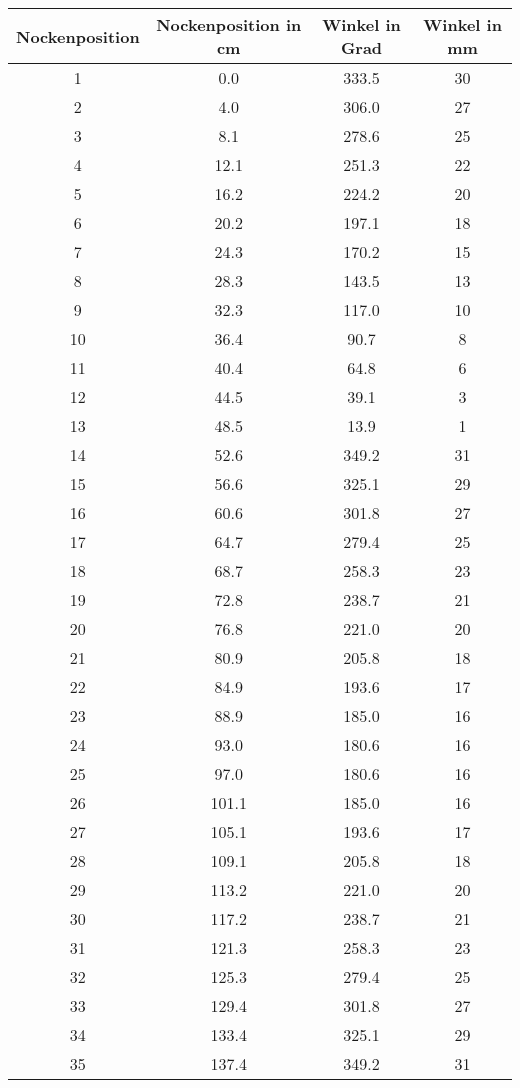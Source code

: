 \documentclass[10pt, a4paper]{article}
\begin{document}
\begin{center}
	\begin{tabular}{c|c|c|c}
		Nockenposition & Nockenposition in cm & Winkel in Grad & Winkel in mm \\
		\hline
		1 & 0.0 & 333.5 & 30 \\
		2 & 4.0 & 306.0 & 27 \\
		3 & 8.1 & 278.6 & 25 \\
		4 & 12.1 & 251.3 & 22 \\
		5 & 16.2 & 224.2 & 20 \\
		6 & 20.2 & 197.1 & 18 \\
		7 & 24.3 & 170.2 & 15 \\
		8 & 28.3 & 143.5 & 13 \\
		9 & 32.3 & 117.0 & 10 \\
		10 & 36.4 & 90.7 & 8 \\
		11 & 40.4 & 64.8 & 6 \\
		12 & 44.5 & 39.1 & 3 \\
		13 & 48.5 & 13.9 & 1 \\
		14 & 52.6 & 349.2 & 31 \\
		15 & 56.6 & 325.1 & 29 \\
		16 & 60.6 & 301.8 & 27 \\
		17 & 64.7 & 279.4 & 25 \\
		18 & 68.7 & 258.3 & 23 \\
		19 & 72.8 & 238.7 & 21 \\
		20 & 76.8 & 221.0 & 20 \\
		21 & 80.9 & 205.8 & 18 \\
		22 & 84.9 & 193.6 & 17 \\
		23 & 88.9 & 185.0 & 16 \\
		24 & 93.0 & 180.6 & 16 \\
		25 & 97.0 & 180.6 & 16 \\
		26 & 101.1 & 185.0 & 16 \\
		27 & 105.1 & 193.6 & 17 \\
		28 & 109.1 & 205.8 & 18 \\
		29 & 113.2 & 221.0 & 20 \\
		30 & 117.2 & 238.7 & 21 \\
		31 & 121.3 & 258.3 & 23 \\
		32 & 125.3 & 279.4 & 25 \\
		33 & 129.4 & 301.8 & 27 \\
		34 & 133.4 & 325.1 & 29 \\
		35 & 137.4 & 349.2 & 31 \\

\end{tabular}
\end{center}
\end{document}
